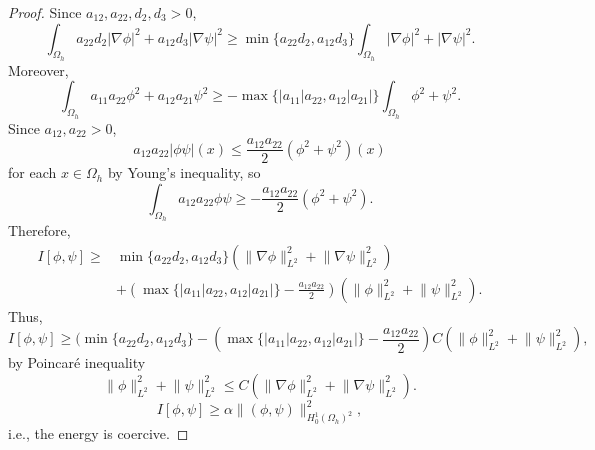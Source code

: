 \documentclass[11pt]{amsart}
\numberwithin{equation}{section}
\theoremstyle{plain}
\theoremstyle{definition}
\begin{document}
\begin{proof}
	Since $a_{12},a_{22},d_2,d_3>0$,
	\begin{equation*}
		\int_{\Omega_h}a_{22}d_2\lvert \nabla \phi \rvert^2 + a_{12}d_3\lvert \nabla \psi \rvert^2 \geq \min \{ a_{22}d_2, a_{12}d_3 \} \int_{\Omega_h}\vert \nabla \phi \rvert^2 + \lvert \nabla \psi \rvert^2.
	\end{equation*}
	Moreover,
	\begin{equation*}
		\int_{\Omega_h}a_{11}a_{22}\phi^2+a_{12}a_{21}\psi^2 \geq -\max \{ \lvert a_{11} \rvert a_{22}, a_{12}\lvert a_{21} \rvert \} \int_{\Omega_h}\phi^2+\psi^2.
	\end{equation*}
	Since $a_{12}, a_{22}>0$,
	\begin{equation*}
		a_{12}a_{22}\lvert \phi \psi \rvert (x) \leq \frac{a_{12}a_{22}}{2}(\phi^2+\psi^2)(x)
	\end{equation*}
	for each $x\in \Omega_h$ by Young's inequality, so
	\begin{equation*}
		\int_{\Omega_h}a_{12}a_{22}\phi \psi \geq - \frac{a_{12}a_{22}}{2}(\phi^2+\psi^2).
	\end{equation*}
	Therefore,
	\begin{equation*}
	\begin{aligned}
		I[\phi,\psi] \geq &\min \{ a_{22}d_2,a_{12}d_3\}(\lVert \nabla \phi \rVert _{L^2}^2+\lVert \nabla \psi \rVert _{L^2}^2)\\
		&+\left(\max \{ \lvert a_{11} \rvert a_{22}, a_{12}\lvert a_{21} \rvert\} - \frac{a_{12}a_{22}}{2}\right)(\lVert \phi \rVert _{L^2}^2+\lVert \psi \rVert _{L^2}^2).
	\end{aligned}
	\end{equation*}
	Thus,
	\begin{equation*}
		I[\phi,\psi] \geq (\min \{ a_{22}d_2, a_{12}d_3 \} -\left(\max \{ \lvert a_{11} \rvert a_{22}, a_{12} \lvert a_{21} \rvert \} - \frac{a_{12}a_{22}}{2}\right)C(\lVert \phi \rVert_{L^2}^2+\lVert \psi \rVert _{L^2}^2),
	\end{equation*}
	by Poincar\'e inequality
	\begin{equation*}
		\lVert \phi \rVert _{L^2}^2 + \lVert \psi \rVert _{L^2}^2 \leq C (\lVert \nabla \phi \rVert _{L^2}^2 + \lVert \nabla \psi \rVert _{L^2}^2).
	\end{equation*}
	\begin{equation*}
		I[\phi, \psi ]\geq \alpha \lVert (\phi, \psi ) \rVert _{H_0^1(\Omega_h)^2}^2,
	\end{equation*}
	i.e., the energy is coercive.
\end{proof}
\end{document}
